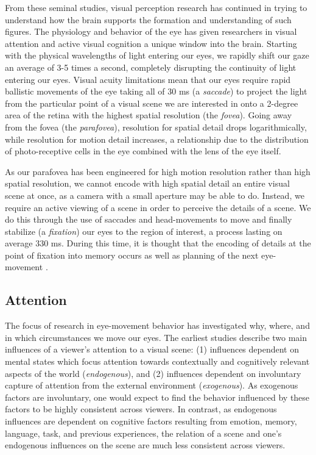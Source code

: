 From these seminal studies, visual perception research has continued in trying to understand how the brain supports the formation and understanding of such figures.  The physiology and behavior of the eye has given researchers in visual attention and active visual cognition a unique window into the brain.  Starting with the physical wavelengths of light entering our eyes, we rapidly shift our gaze an average of 3-5 times a second, completely disrupting the continuity of light entering our eyes.  Visual acuity limitations mean that our eyes require rapid ballistic movements of the eye taking all of 30 ms (a \textit{saccade}) to project the light from the particular point of a visual scene we are interested in onto a 2-degree area of the retina with the highest spatial resolution (the \textit{fovea}).  Going away from the fovea (the \textit{parafovea}), resolution for spatial detail drops logarithmically, while resolution for motion detail increases, a relationship due to the distribution of photo-receptive cells in the eye combined with the lens of the eye itself.  

As our parafovea has been engineered for high motion resolution rather than high spatial resolution, we cannot encode with high spatial detail an entire visual scene at once, as a camera with a small aperture may be able to do.  Instead, we require an active viewing of a scene in order to perceive the details of a scene.  We do this through the use of saccades and head-movements to move and finally stabilize (a \textit{fixation}) our eyes to the region of interest, a process lasting on average 330 ms.  During this time, it is thought that the encoding of details at the point of fixation into memory occurs as well as planning of the next eye-movement \cite{}.  

\subsection{Attention}

The focus of research in eye-movement behavior has investigated why, where, and in which circumstances we move our eyes.  The earliest studies \cite{Buswell1935,Yarbus1967} describe two main influences of a viewer's attention to a visual scene: (1) influences dependent on mental states which focus attention towards contextually and cognitively relevant aspects of the world (\textit{endogenous}), and (2) influences dependent on involuntary capture of attention from the external environment (\textit{exogenous}).  As exogenous factors are involuntary, one would expect to find the behavior influenced by these factors to be highly consistent across viewers.  In contrast, as endogenous influences are dependent on cognitive factors resulting from emotion, memory, language, task, and previous experiences, the relation of a scene and one's endogenous influences on the scene are much less consistent across viewers.  

